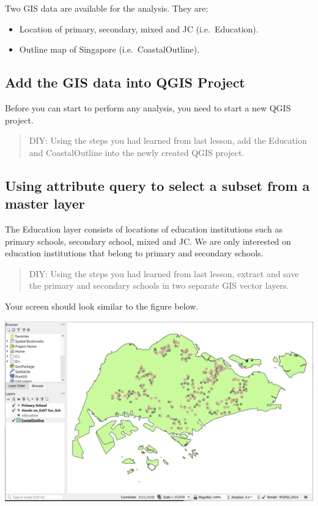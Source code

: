 \documentclass[
  letterpaper,
  DIV=11,
  numbers=noendperiod]{scrreprt}
\providecommand{\tightlist}{%
  \setlength{\itemsep}{0pt}\setlength{\parskip}{0pt}}\usepackage{longtable,booktabs,array}
\begin{document}
Two GIS data are available for the analysis. They are:

\begin{itemize}
\tightlist
\item
  Location of primary, secondary, mixed and JC (i.e.~Education).
\item
  Outline map of Singapore (i.e.~CoastalOutline).
\end{itemize}

\hypertarget{add-the-gis-data-into-qgis-project}{%
\subsection{Add the GIS data into QGIS
Project}\label{add-the-gis-data-into-qgis-project}}

Before you can start to perform any analysis, you need to start a new
QGIS project.

\begin{quote}
DIY: Using the steps you had learned from last lesson, add the Education
and CoastalOutline into the newly created QGIS project.
\end{quote}

\hypertarget{using-attribute-query-to-select-a-subset-from-a-master-layer-1}{%
\subsection{Using attribute query to select a subset from a master
layer}\label{using-attribute-query-to-select-a-subset-from-a-master-layer-1}}

The Education layer consists of locations of education institutions such
as primary schools, secondary school, mixed and JC. We are only
interested on education institutions that belong to primary and
secondary schools.

\begin{quote}
DIY: Using the steps you had learned from last lesson, extract and save
the primary and secondary schools in two separate GIS vector layers.
\end{quote}

Your screen should look similar to the figure below.

\includegraphics{./img06/image1.jpg}
\end{document}
